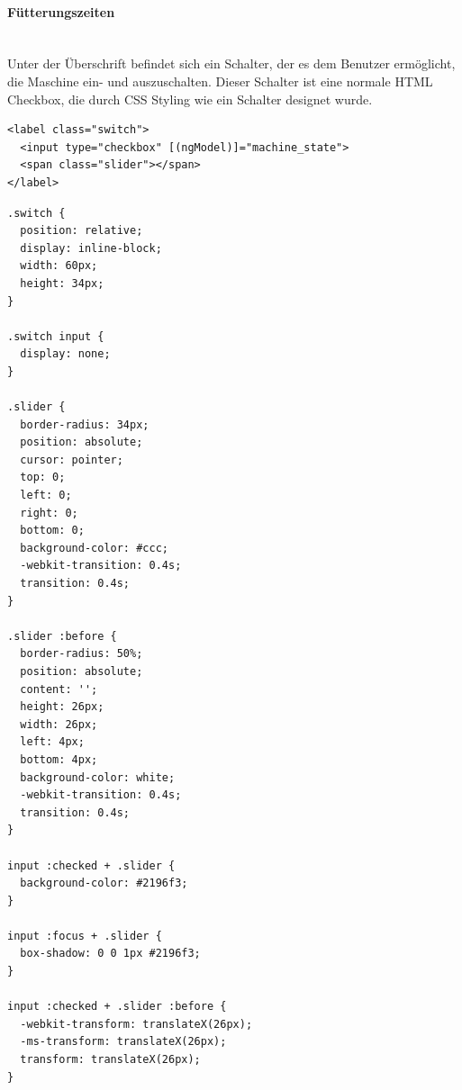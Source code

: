 \paragraph*{Fütterungszeiten}\mbox{}\\
Unter der Überschrift befindet sich ein Schalter, der es dem Benutzer ermöglicht, die Maschine ein- und auszuschalten. Dieser Schalter ist eine normale \ac{HTML} Checkbox, die durch \ac{CSS} Styling wie ein Schalter designet wurde.

\begin{lstlisting}[caption=HTML Schalter,label=html-schalter,style=HTML]
<label class="switch">
  <input type="checkbox" [(ngModel)]="machine_state">
  <span class="slider"></span>
</label>
\end{lstlisting}

\begin{lstlisting}[caption=CSS Schalter,label=css-schalter,style=css]
.switch {
  position: relative;
  display: inline-block;
  width: 60px;
  height: 34px;
}

.switch input {
  display: none;
}

.slider {
  border-radius: 34px;
  position: absolute;
  cursor: pointer;
  top: 0;
  left: 0;
  right: 0;
  bottom: 0;
  background-color: #ccc;
  -webkit-transition: 0.4s;
  transition: 0.4s;
}

.slider :before {
  border-radius: 50%;
  position: absolute;
  content: '';
  height: 26px;
  width: 26px;
  left: 4px;
  bottom: 4px;
  background-color: white;
  -webkit-transition: 0.4s;
  transition: 0.4s;
}

input :checked + .slider {
  background-color: #2196f3;
}

input :focus + .slider {
  box-shadow: 0 0 1px #2196f3;
}

input :checked + .slider :before {
  -webkit-transform: translateX(26px);
  -ms-transform: translateX(26px);
  transform: translateX(26px);
}
\end{lstlisting}

